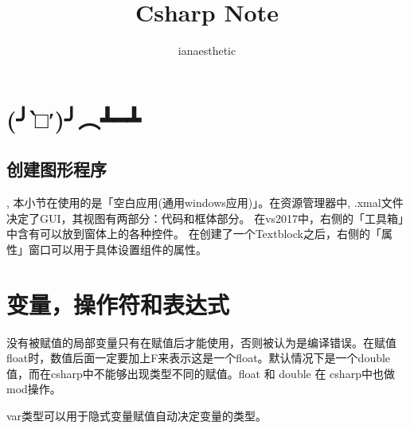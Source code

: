 \documentclass[10pt, a4paper]{article}
\title{Csharp Note}
\author{ianaesthetic}
\begin{document}
\maketitle
\newpage

    \section{(╯‵□′)╯︵┻━┻}
        \subsection{创建图形程序},
            本小节在使用的是「空白应用(通用windows应用)」。在资源管理器中, .xmal文件决定了GUI，其视图有两部分：代码和框体部分。 在vs2017中，右侧的「工具箱」中含有可以放到窗体上的各种控件。 在创建了一个Textblock之后，右侧的「属性」窗口可以用于具体设置组件的属性。
    
    \section{变量，操作符和表达式}
        没有被赋值的局部变量只有在赋值后才能使用，否则被认为是编译错误。在赋值float时，数值后面一定要加上F来表示这是一个float。默认情况下是一个double值，而在csharp中不能够出现类型不同的赋值。float 和 double 在 csharp中也做 mod操作。

        var类型可以用于隐式变量赋值自动决定变量的类型。
    
\end{document}
